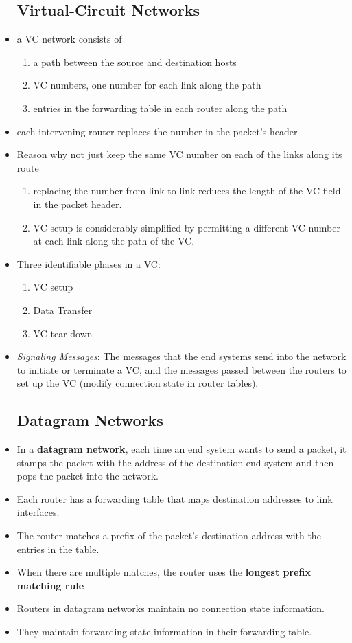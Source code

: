 \message{ !name(chapter4.tex)}\documentclass{article}
\begin{document}
\begin{itemize}
\subsection{Virtual-Circuit Networks}
\item a VC network consists of
\begin{enumerate}
\item a path between the source and destination hosts
\item VC numbers, one number for each link along the path
\item entries in the forwarding table in each router along the path
\end{enumerate}
\item each intervening router replaces the number in the packet's
  header
\item Reason why not just keep the same VC number on each of the links
  along its route
\begin{enumerate}
\item replacing the number from link to link reduces the length of the
  VC field in the packet header.
\item VC setup is considerably simplified by permitting a different VC
  number at each link along the path of the VC.
\end{enumerate}
\item Three identifiable phases in a VC:
\begin{enumerate}
\item VC setup
\item Data Transfer
\item VC tear down
\end{enumerate}
\item \emph{Signaling Messages}: The messages that the end systems
  send into the network to initiate or terminate a VC, and the
  messages passed between the routers to set up the VC (modify
  connection state in router tables).
\subsection{Datagram Networks}
\item In a \textbf{datagram network}, each time an end system wants to
  send a packet, it stamps the packet with the address of the
  destination end system and then pops the packet into the network.
\item Each router has a forwarding table that maps destination
addresses to link interfaces.
\item The router matches a prefix of the packet's destination address
  with the entries in the table.
\item When there are multiple matches, the router uses the
  \textbf{longest prefix matching rule}
\item Routers in datagram networks maintain no connection state
  information.
\item They maintain forwarding state information in their forwarding
  table.

\end{itemize}
\end{document}
